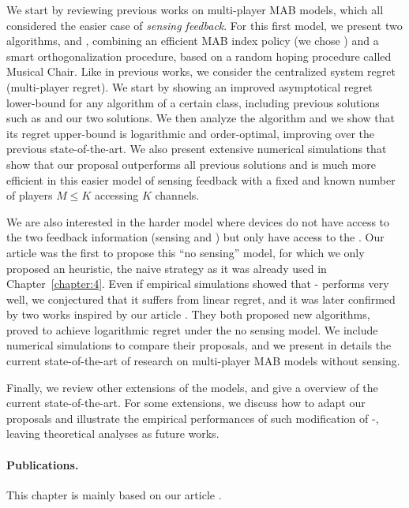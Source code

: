 We start by reviewing previous works on multi-player MAB models, which all considered the easier case of \emph{sensing feedback}.
%
For this first model, we present two algorithms, \RandTopM{} and \MCTopM, combining an efficient MAB index policy (we chose \klUCB) and a smart orthogonalization procedure, based on a random hoping procedure called Musical Chair.
Like in previous works, we consider the centralized system regret (multi-player regret).
We start by showing an improved asymptotical regret lower-bound for any algorithm of a certain class, including previous solutions such as \rhoRand{} and our two solutions.
We then analyze the \MCTopM{} algorithm and we show that its regret upper-bound is logarithmic and order-optimal, improving over the previous state-of-the-art.
We also present extensive numerical simulations that show that our proposal outperforms all previous solutions and is much more efficient in this easier model of sensing feedback with a fixed and known number of players $M \leq K$ accessing $K$ channels.

We are also interested in the harder model where devices do not have access to the two feedback information (sensing and \Ack) but only have access to the \Ack.
Our article \cite{Besson2018ALT} was the first to propose this ``no sensing'' model, for which we only proposed an heuristic, the naive \Selfish{} strategy as it was already used in Chapter~\ref{chapter:4}.
Even if empirical simulations showed that \Selfish-\klUCB{} performs very well, we conjectured that it suffers from linear regret, and it was later confirmed by two works inspired by our article \cite{LugosiMehrabian18,BoursierPerchet18}.
They both proposed new algorithms, proved to achieve logarithmic regret under the no sensing model.
We include numerical simulations to compare their proposals, and we present in details the current state-of-the-art of research on multi-player MAB models without sensing.

Finally, we review other extensions of the models, and give a overview of the current state-of-the-art.
For some extensions, we discuss how to adapt our proposals and illustrate the empirical performances of such modification of \MCTopM-\klUCB{}, leaving theoretical analyses as future works.


\paragraph{Publications.}
%
This chapter is mainly based on our article \cite{Besson2018ALT}.

